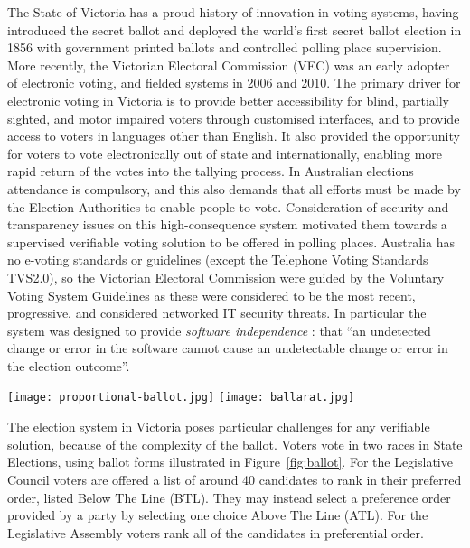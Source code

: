 \documentclass[twocolumn]{article}
\begin{document}
The State of Victoria has a proud history of innovation in voting systems, having introduced the secret ballot and deployed the world's first secret ballot election in 1856 \cite{McKenna} with government printed ballots and controlled polling place supervision.  More recently, the Victorian Electoral Commission (VEC) was an early adopter of electronic voting, and fielded systems in 2006 and 2010.   The primary driver for electronic voting in Victoria is to provide better accessibility for blind, partially sighted, and motor impaired voters through customised interfaces, and to provide access to voters in languages other than English.  It also provided the opportunity for voters to vote electronically out of state and internationally, enabling more rapid return of the votes into the tallying process.  In Australian elections attendance is compulsory, and this also demands that all efforts must be made by the Election Authorities to enable people to vote.  Consideration of security and transparency issues on this high-consequence system motivated them towards a supervised verifiable voting solution to be offered in polling places.  Australia has no e-voting standards or guidelines (except the Telephone Voting Standards TVS2.0), so the Victorian Electoral Commission were guided by the Voluntary Voting System Guidelines \cite{VVSG} as these were considered to be the most recent, progressive, and considered networked IT security threats.  In particular the system was designed to provide {\em software independence} \cite{rivest2008notion}: that ``an undetected change or error in the software cannot cause an undetectable change or error in the election outcome''.

\begin{figure*}
\begin{center}
\texttt{[image: proportional-ballot.jpg]}
\hspace*{1cm}
\texttt{[image: ballarat.jpg]}
\end{center}
\caption{Legislative Council and Legislative Assembly Ballot forms}
\label{fig:ballot}
\end{figure*}

The election system in Victoria poses particular challenges for any verifiable solution, because of the complexity of the ballot.  Voters vote in two races in State Elections, using ballot forms illustrated in Figure~\ref{fig:ballot}.  For the Legislative Council voters are offered a list of around 40 candidates to rank in their preferred order, listed Below The Line (BTL).  They may instead select a preference order provided by a party by selecting one choice Above The Line (ATL).  For the Legislative Assembly voters rank all of the candidates in preferential order. 
\end{document}
